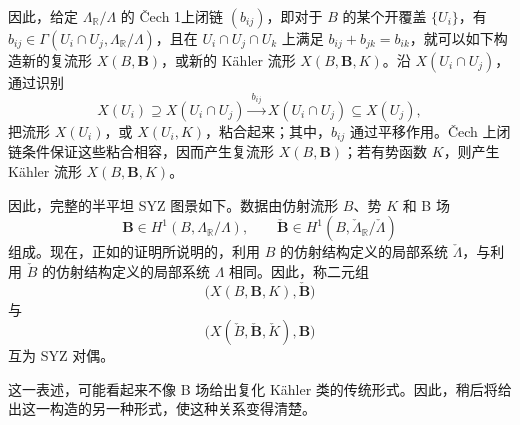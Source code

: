 因此，给定 $\Lambda_{\mathbb R}/\Lambda$ 的 Čech 1上闭链 $(b_{ij})$，即对于 $B$ 的某个开覆盖 $\{U_i\}$，有 $b_{ij}\in\Gamma(U_i\cap U_j,\Lambda_{\mathbb R}/\Lambda)$，且在 $U_i\cap U_j\cap U_k$ 上满足 $b_{ij}+b_{jk}=b_{ik}$，就可以如下构造新的复流形 $X(B,\mathbf B)$，或新的 Kähler 流形 $X(B,\mathbf B,K)$。沿 $X(U_i\cap U_j)$，通过识别
\[
X(U_i)\supseteq X(U_i\cap U_j)
\xrightarrow{\ b_{ij}\ }X(U_i\cap U_j)\subseteq X(U_j),
\]
把流形 $X(U_i)$，或 $X(U_i,K)$，粘合起来；其中，$b_{ij}$ 通过平移作用。Čech 上闭链条件保证这些粘合相容，因而产生复流形 $X(B,\mathbf B)$；若有势函数 $K$，则产生 Kähler 流形 $X(B,\mathbf B,K)$。

因此，完整的半平坦 SYZ 图景如下。数据由仿射流形 $B$、势 $K$ 和 B 场
\[
\mathbf B\in H^1(B,\Lambda_{\mathbb R}/\Lambda),
\qquad
\check{\mathbf B}\in H^1(B,\check\Lambda_{\mathbb R}/\check\Lambda)
\]
组成。现在，正如的证明所说明的，利用 $B$ 的仿射结构定义的局部系统 $\check\Lambda$，与利用 $\check B$ 的仿射结构定义的局部系统 $\Lambda$ 相同。因此，称二元组
\[
\bigl(X(B,\mathbf B,K),\check{\mathbf B}\bigr)
\]
与
\[
\bigl(X(\check B,\check{\mathbf B},\check K),\mathbf B\bigr)
\]
互为 SYZ 对偶。

这一表述，可能看起来不像 B 场给出复化 Kähler 类的传统形式。因此，稍后将给出这一构造的另一种形式，使这种关系变得清楚。

